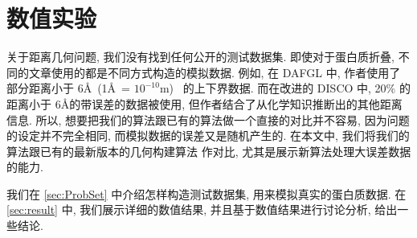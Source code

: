 \documentclass{CASthesis_zzk}
\begin{document}
%
%
%

\section{数值实验}
\label{sec:NumResult}
关于距离几何问题, 我们没有找到任何公开的测试数据集.
即使对于蛋白质折叠, 不同的文章使用的都是不同方式构造的模拟数据.
例如, 在 DAFGL \cite{Biswas2008} 中, 
作者使用了部分距离小于 6\AA ~(1\AA ~= $10^{-10}$m)~ 的上下界数据.
而在改进的 DISCO \cite{Fang2013} 中, 
20\% 的距离小于 6\AA 的带误差的数据被使用,
但作者结合了从化学知识推断出的其他距离信息.
所以, 想要把我们的算法跟已有的算法做一个直接的对比并不容易,
因为问题的设定并不完全相同, 而模拟数据的误差又是随机产生的.
在本文中, 我们将我们的算法跟已有的最新版本的几何构建算法 \cite{Sit2009} 作对比, 
尤其是展示新算法处理大误差数据的能力.

我们在 \ref{sec:ProbSet} 中介绍怎样构造测试数据集, 用来模拟真实的蛋白质数据.
在 \ref{sec:result} 中, 我们展示详细的数值结果, 
并且基于数值结果进行讨论分析, 给出一些结论.
\end{document}
